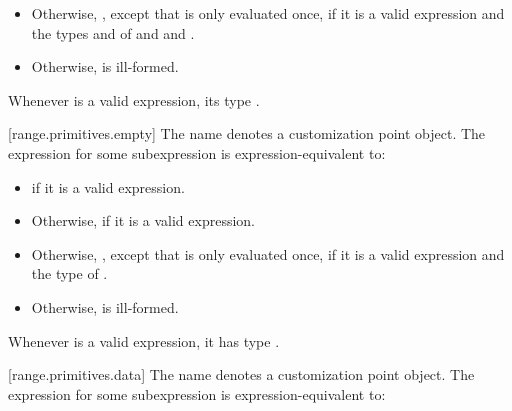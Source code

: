 {\begin{itemize}
\item
  Otherwise,
  , except that 
  is only evaluated once, if it is a valid expression and the types  and  of
   and   
   and
  . 

\item
  Otherwise,  is ill-formed.
\end{itemize}

\pnum
\begin{note}
Whenever  is a valid expression, its
type   .
\end{note}

[range.primitives.empty]{}
\pnum
The name  denotes a customization point
object. The expression
 for some subexpression  is
expression-equivalent to:

\begin{itemize}
\item
   if it is a valid expression.

\item
  Otherwise,  if it is a valid expression.

\item
  Otherwise, ,
  except that  is only evaluated once, if it is a valid expression and the type of
     .

\item
  Otherwise,  is ill-formed.
\end{itemize}

\pnum
\begin{note}
Whenever  is a valid expression, it
has type .
\end{note}

[range.primitives.data]{}
\pnum
The name  denotes a customization point
object. The expression
 for some subexpression  is
expression-equivalent to:

}
